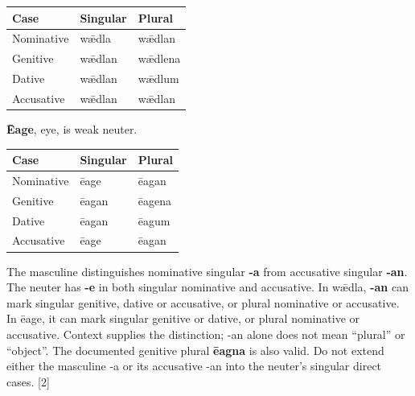 \par\begingroup
\fontsize{10.5}{13.2}\selectfont
\setlength{\LTleft}{0pt}\setlength{\LTright}{\fill}
\noindent
\begin{tabular}{@{}>{\raggedright\arraybackslash}p{39.46mm}>{\raggedright\arraybackslash}p{39.46mm}>{\raggedright\arraybackslash}p{39.46mm}@{}}
\toprule
\textbf{Case} & \textbf{Singular} & \textbf{Plural} \\
\midrule
Nominative & wǣdla & wǣdlan \\
Genitive & wǣdlan & wǣdlena \\
Dative & wǣdlan & wǣdlum \\
Accusative & wǣdlan & wǣdlan \\
\bottomrule
\end{tabular}
\par\endgroup

\textbf{Ēage}, eye, is weak neuter.

\par\begingroup
\fontsize{10.5}{13.2}\selectfont
\setlength{\LTleft}{0pt}\setlength{\LTright}{\fill}
\noindent
\begin{tabular}{@{}>{\raggedright\arraybackslash}p{39.46mm}>{\raggedright\arraybackslash}p{39.46mm}>{\raggedright\arraybackslash}p{39.46mm}@{}}
\toprule
\textbf{Case} & \textbf{Singular} & \textbf{Plural} \\
\midrule
Nominative & ēage & ēagan \\
Genitive & ēagan & ēagena \\
Dative & ēagan & ēagum \\
Accusative & ēage & ēagan \\
\bottomrule
\end{tabular}
\par\endgroup

The masculine distinguishes nominative singular \textbf{-a} from accusative singular \textbf{-an}. The neuter has \textbf{-e} in both singular nominative and accusative. In wǣdla, \textbf{-an} can mark singular genitive, dative or accusative, or plural nominative or accusative. In ēage, it can mark singular genitive or dative, or plural nominative or accusative. Context supplies the distinction; -an alone does not mean “plural” or “object”. The documented genitive plural \textbf{ēagna} is also valid. Do not extend either the masculine -a or its accusative -an into the neuter's singular direct cases. [2]

